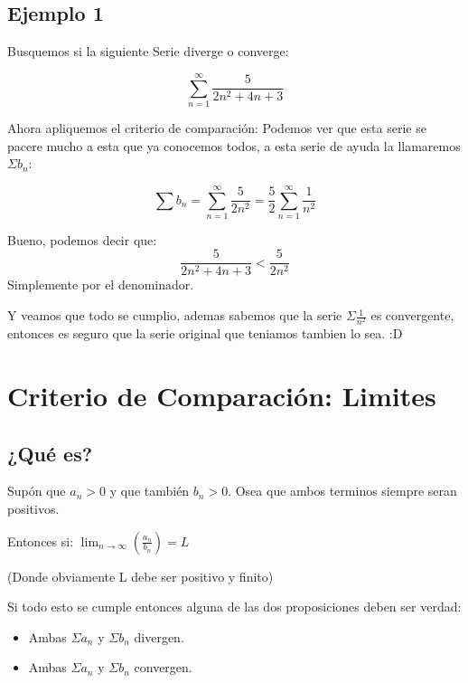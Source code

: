 \documentclass[12pt]{article}							    %
\begin{document}
\subsection{Ejemplo 1}
Busquemos si la siguiente Serie diverge o converge:

\begin{equation*}
    \sum_{n=1}^{\infty} \frac{5}{2n^2 +4n +3}
\end{equation*}

Ahora apliquemos el criterio de comparación: Podemos ver que esta serie se pacere mucho a esta que ya conocemos todos, a esta serie de ayuda la llamaremos $\Sigma b_n$:

\begin{equation*}
    \sum b_n = \sum_{n=1}^{\infty} \frac{5}{2n^2} = \frac{5}{2}\sum_{n=1}^{\infty} \frac{1}{n^2}
\end{equation*}

Bueno, podemos decir que:
\begin{equation*}
    \frac{5}{2n^2 +4n +3} < \frac{5}{2n^2}
\end{equation*}
Simplemente por el denominador.

Y veamos que todo se cumplio, ademas sabemos que la serie $\Sigma \frac{1}{n^2}$ es convergente, entonces es seguro que la serie original que teniamos tambien lo sea. :D



\clearpage
\section{Criterio de Comparación: Limites}


\subsection{¿Qué es?}
Supón que $a _n > 0$ y que también $b_n > 0$. Osea que ambos terminos siempre seran positivos.

Entonces si:
$\lim_{n \to \infty} \left( \frac{a_n}{b_n} \right) = L$

(Donde obviamente L debe ser positivo y finito)

Si todo esto se cumple entonces alguna de las dos proposiciones deben ser verdad:
\begin{itemize}
    \item Ambas $\Sigma a_n$ y $\Sigma b_n$ divergen.
    \item Ambas $\Sigma a_n$ y $\Sigma b_n$ convergen.
\end{itemize}
\end{document}
